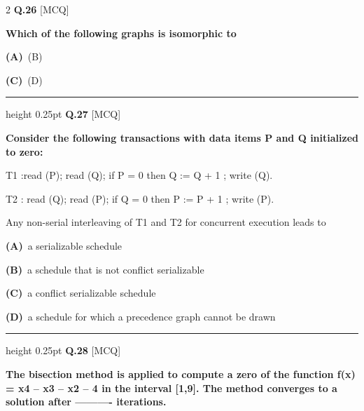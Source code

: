 \documentclass[a4paper,10pt,twoside]{article}
\begin{document}
\begin{multicols}{2}
\noindent\textbf{Q.26} \hfill {\footnotesize\textsf{[MCQ]}}
\par\vspace{2pt}
{\bfseries Which of the following graphs is isomorphic to \par}
\par\vspace{2pt}\noindent
\textbf{(A)}~(B)\par\vspace{2pt}\noindent
\textbf{(C)}~(D)
\par\vspace{6pt}\hrule height 0.25pt\vspace{6pt}
\noindent\textbf{Q.27} \hfill {\footnotesize\textsf{[MCQ]}}
\par\vspace{2pt}
{\bfseries Consider the following transactions with data items P and Q initialized to zero:
\par\smallskip
T1 :read (P);
read (Q);
if P = 0 then Q := Q + 1 ;
write (Q).
\par\smallskip
T2 : read (Q);
read (P);
if Q = 0 then P := P + 1 ;
write (P).
\par\smallskip
Any non-serial interleaving of T1 and T2 for concurrent execution leads to \par}
\par\vspace{2pt}\noindent
\textbf{(A)}~a serializable schedule\par\vspace{2pt}\noindent
\textbf{(B)}~a schedule that is not conflict serializable\par\vspace{2pt}\noindent
\textbf{(C)}~a conflict serializable schedule\par\vspace{2pt}\noindent
\textbf{(D)}~a schedule for which a precedence graph cannot be drawn
\par\vspace{6pt}\hrule height 0.25pt\vspace{6pt}
\noindent\textbf{Q.28} \hfill {\footnotesize\textsf{[MCQ]}}
\par\vspace{2pt}
{\bfseries The bisection method is applied to compute a zero of the function f(x) = x4 -- x3 -- x2 -- 4 in the
interval [1,9]. The method converges to a solution after ---------- iterations. \par}
\par\vspace{2pt}\noindent

\end{multicols}
\end{document}
